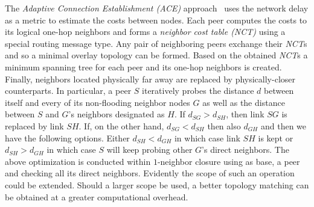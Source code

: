 The \emph{Adaptive Connection Establishment (ACE)} 
approach~\cite{LZXN2004} uses the network delay as a metric 
to estimate the costs between nodes. Each peer computes the costs to its
logical one-hop neighbors and forms a \emph{neighbor cost table (NCT)} 
using a special routing message type. 
Any pair of neighboring peers exchange their \emph{NCT}s 
and so a minimal overlay topology can be formed. Based on the obtained
\emph{NCT}s a minimum spanning tree for each peer and its one-hop neighbors is
created. Finally, neighbors located physically far away 
are replaced by physically-closer counterparts. 
In particular, a peer $S$ iteratively probes the distance $d$ between
itself and every of its non-flooding neighbor nodes $G$ as well as
the distance between $S$ and $G$'s neighbors designated as $H$.
If $d_{SG} > d_{SH}$, then link $SG$ is replaced by link $SH$. If, on the other
hand, $d_{SG} < d_{SH}$ then also $d_{GH}$ and then we have the following
options. Either $d_{SH} < d_{GH}$ in which case link $SH$ is kept or
$d_{SH} > d_{GH}$ in which case $S$ will keep probing other $G$'s direct
neighbors.
%
The above optimization is conducted within $1$-neighbor
closure using as base, a peer and checking all its direct neighbors.
Evidently the scope of such an operation could be extended.
Should  a larger scope be used, a better topology matching can be obtained 
at a greater computational overhead.
%
%
%


